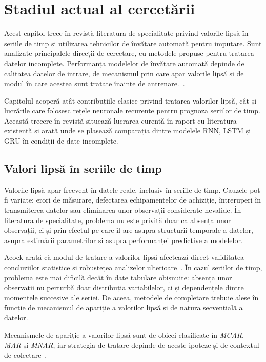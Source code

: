 \chapter{Stadiul actual al cercetării}

Acest capitol trece în revistă literatura de specialitate privind valorile lipsă în seriile de timp și utilizarea tehnicilor de învățare automată pentru imputare. Sunt analizate principalele direcții de cercetare, cu metodele propuse pentru tratarea datelor incomplete. Performanța modelelor de învățare automată depinde de calitatea datelor de intrare, de mecanismul prin care apar valorile lipsă și de modul în care acestea sunt tratate înainte de antrenare.~\cite{rubin1976inference, little2002missing, schafer2002missing}.

Capitolul acoperă atât contribuțiile clasice privind tratarea valorilor lipsă, cât și lucrările care folosesc rețele neuronale recurente pentru prognoza seriilor de timp. Această trecere în revistă situează lucrarea curentă în raport cu literatura existentă și arată unde se plasează comparația dintre modelele RNN, LSTM și GRU în condiții de date incomplete.

\section{Valori lipsă în seriile de timp}

Valorile lipsă apar frecvent în datele reale, inclusiv în seriile de timp. Cauzele pot fi variate: erori de măsurare, defectarea echipamentelor de achiziție, întreruperi în transmiterea datelor sau eliminarea unor observații considerate nevalide. În literatura de specialitate, problema nu este privită doar ca absența unor observații, ci și prin efectul pe care îl are asupra structurii temporale a datelor, asupra estimării parametrilor și asupra performanței predictive a modelelor.

Acock arată că modul de tratare a valorilor lipsă afectează direct validitatea concluziilor statistice și robustețea analizelor ulterioare~\cite{acock2005missing}. În cazul seriilor de timp, problema este mai dificilă decât în date tabulare obișnuite: absența unor observații nu perturbă doar distribuția variabilelor, ci și dependențele dintre momentele succesive ale seriei. De aceea, metodele de completare trebuie alese în funcție de mecanismul de apariție a valorilor lipsă și de natura secvențială a datelor.

Mecanismele de apariție a valorilor lipsă sunt de obicei clasificate în \textit{MCAR}, \textit{MAR} și \textit{MNAR}, iar strategia de tratare depinde de aceste ipoteze și de contextul de colectare~\cite{rubin1976inference, little2002missing}.

